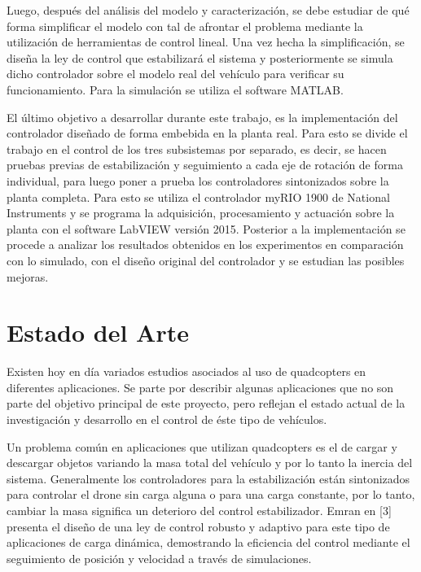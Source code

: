 \documentclass[../main.tex]{subfiles}
\begin{document}
Luego, después del análisis del modelo y caracterización, se debe
estudiar de qué forma simplificar el modelo con tal de afrontar el
problema mediante la utilización de herramientas de control lineal.
Una vez hecha la simplificación, se diseña la ley de control que estabilizará
el sistema y posteriormente se simula dicho controlador sobre el modelo
real del vehículo para verificar su funcionamiento. Para la simulación
se utiliza el software MATLAB.

El último objetivo a desarrollar durante este trabajo, es la implementación
del controlador diseñado de forma embebida en la planta real. Para
esto se divide el trabajo en el control de los tres subsistemas por
separado, es decir, se hacen pruebas previas de estabilización y seguimiento
a cada eje de rotación de forma individual, para luego poner a prueba
los controladores sintonizados sobre la planta completa. Para esto
se utiliza el controlador myRIO 1900 de National Instruments y se
programa la adquisición, procesamiento y actuación sobre la planta
con el software LabVIEW versión 2015. Posterior a la implementación
se procede a analizar los resultados obtenidos en los experimentos
en comparación con lo simulado, con el diseño original del controlador
y se estudian las posibles mejoras.

\textcompwordmark{}

\section[Estado del Arte]{Estado del Arte}

Existen hoy en día variados estudios asociados al uso de quadcopters
en diferentes aplicaciones. Se parte por describir algunas aplicaciones
que no son parte del objetivo principal de este proyecto, pero reflejan
el estado actual de la investigación y desarrollo en el control de
éste tipo de vehículos.

Un problema común en aplicaciones que utilizan quadcopters es el de
cargar y descargar objetos variando la masa total del vehículo y por
lo tanto la inercia del sistema. Generalmente los controladores para
la estabilización están sintonizados para controlar el drone sin carga
alguna o para una carga constante, por lo tanto, cambiar la masa significa
un deterioro del control estabilizador. Emran en {[}3{]} presenta
el diseño de una ley de control robusto y adaptivo para este tipo
de aplicaciones de carga dinámica, demostrando la eficiencia del control
mediante el seguimiento de posición y velocidad a través de simulaciones. 
\end{document}
